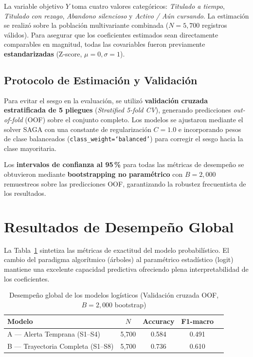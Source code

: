 La variable objetivo $Y$ toma cuatro valores categóricos:
\emph{Titulado a tiempo}, \emph{Titulado con rezago}, \emph{Abandono silencioso} y
\emph{Activo / Aún cursando}. La estimación se realizó sobre la población multivariante combinada
($N = 5{,}700$ registros válidos). Para asegurar que los coeficientes estimados sean directamente
comparables en magnitud, todas las covariables fueron previamente \textbf{estandarizadas} (Z-score, $\mu=0, \sigma=1$).

\subsection{Protocolo de Estimación y Validación}

Para evitar el sesgo en la evaluación, se utilizó \textbf{validación cruzada estratificada
de 5 pliegues} (\emph{Stratified 5-fold CV}), generando predicciones \emph{out-of-fold} (OOF)
sobre el conjunto completo. Los modelos se ajustaron mediante el solver SAGA con una constante
de regularización $C = 1.0$ e incorporando pesos de clase balanceados (\texttt{class\_weight=`balanced'})
para corregir el sesgo hacia la clase mayoritaria.

Los \textbf{intervalos de confianza al 95\,\%} para todas las métricas de desempeño se obtuvieron
mediante \textbf{bootstrapping no paramétrico} con $B = 2{,}000$ remuestreos sobre las
predicciones OOF, garantizando la robustez frecuentista de los resultados.

\section{Resultados de Desempeño Global}

La Tabla~\ref{tab:rf_global} sintetiza las métricas de exactitud del modelo probabilístico.
El cambio del paradigma algorítmico (árboles) al paramétrico estadístico (logit) mantiene una
excelente capacidad predictiva ofreciendo plena interpretabilidad de los coeficientes.

\begin{table}[H]
\centering
\caption{Desempeño global de los modelos logísticos (Validación cruzada OOF, $B=2{,}000$ bootstrap)}
\label{tab:rf_global}
\begin{tabular}{lcccc}
\toprule
\textbf{Modelo} & \textbf{$N$} & \textbf{Accuracy} & \textbf{F1-macro} \\
\midrule
A — Alerta Temprana (S1–S4) & 5,700 & 0.584 & 0.491 \\
B — Trayectoria Completa (S1–S8) & 5,700 & 0.736 & 0.610 \\
\bottomrule
\end{tabular}
\end{table}

